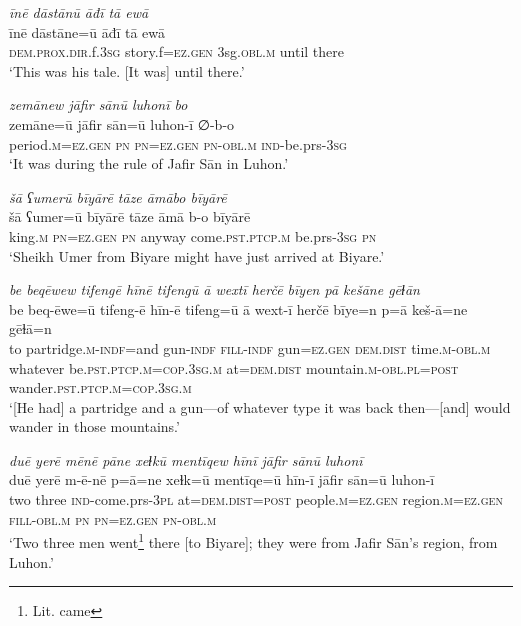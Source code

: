 \ea \label{BP.212}
\textit{īnē dāstānū āđī tā ewā} \\ 
\gll īnē dāstāne=ū āđī tā ewā \\ 
 \textsc{dem.prox}\textsc{.dir}.f\textsc{.3sg} story.f\textsc{=ez.gen} 3sg\textsc{.obl}\textsc{.m} until there \\ 
\glt `This was his tale. [It was] until there.'
\z 
 

\ea \label{ŠJ.1}
\textit{zemānew jāfir sānū luhonī bo} \\ 
\gll zemāne=ū jāfir sān=ū luhon-ī ∅-b-o \\ 
 period\textsc{.m}\textsc{=ez.gen} \textsc{pn} \textsc{pn}\textsc{=ez.gen} \textsc{pn}\textsc{-obl}\textsc{.m} \textsc{ind-}be.prs\textsc{-3sg} \\ 
\glt `It was during the rule of Jafir Sān in Luhon.'
\z 
 
\ea \label{ŠJ.2}
\textit{šā ʕumerū bīyārē tāze āmābo bīyārē} \\ 
\gll šā ʕumer=ū bīyārē tāze āmā b-o bīyārē \\ 
 king\textsc{.m} \textsc{pn}\textsc{=ez.gen} \textsc{pn} anyway come\textsc{.pst}\textsc{.ptcp}\textsc{.m} be.prs\textsc{-3sg} \textsc{pn} \\ 
\glt `Sheikh Umer from Biyare might have just arrived at Biyare.'
\z 
 
\ea \label{ŠJ.7}
\textit{be beqēwew tifengē hīnē tifengū ā wextī herčē bīyen pā kešāne gēɫān} \\ 
\gll be beq-ēwe=ū tifeng-ē hīn-ē tifeng=ū ā wext-ī herčē bīye=n p=ā keš-ā=ne gēɫā=n \\ 
 to partridge\textsc{.m}\textsc{-indf}=and gun\textsc{-indf} \textsc{fill}\textsc{-indf} gun\textsc{=ez.gen} \textsc{dem.dist} time\textsc{.m}\textsc{-obl}\textsc{.m} whatever be\textsc{.pst}\textsc{.ptcp}\textsc{.m}\textsc{=cop}\textsc{.3sg}\textsc{.m} at=\textsc{dem.dist} mountain\textsc{.m}\textsc{-obl}\textsc{.pl}\textsc{=\textsc{post}} wander\textsc{.pst}\textsc{.ptcp}\textsc{.m}\textsc{=cop}\textsc{.3sg}\textsc{.m} \\ 
\glt `[He had] a partridge and a gun—of whatever type it was back then—[and] would wander in those mountains.'
\z 
 
\ea \label{ŠJ.9}
\textit{duē yerē mēnē pāne xeɫkū mentīqew hīnī jāfir sānū luhonī} \\ 
\gll duē yerē m-ē-nē p=ā=ne xeɫk=ū mentīqe=ū hīn-ī jāfir sān=ū luhon-ī \\ 
 two three \textsc{ind-}come.prs\textsc{-3pl} at=\textsc{dem.dist}\textsc{=\textsc{post}} people\textsc{.m}\textsc{=ez.gen} region\textsc{.m}\textsc{=ez.gen} \textsc{fill}\textsc{-obl}\textsc{.m} \textsc{pn} \textsc{pn}\textsc{=ez.gen} \textsc{pn}\textsc{-obl}\textsc{.m} \\ 
\glt `Two three men went\footnote{Lit. came} there [to Biyare]; they were from Jafir Sān’s region, from Luhon.'
\z 
 
